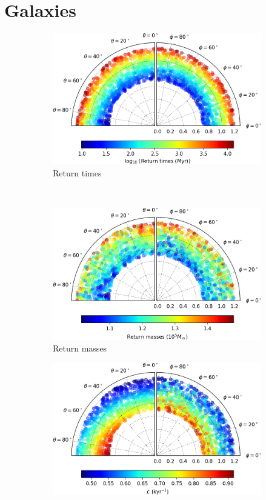 \chapter{Galaxies}

\begin{figure}[h]
    \centering
    \begin{subfigure}[t]{0.4\textwidth}
        \includegraphics[width = \textwidth]{"../Files/Week 13/images/21_time"}
        \caption{Return times}
    \end{subfigure}
    ~ 
    \begin{subfigure}[t]{0.4\textwidth}
        \includegraphics[width=\textwidth]{"../Files/Week 13/images/21_mass"}
        \caption{Return masses}
    \end{subfigure}
    \begin{subfigure}[t]{0.4\textwidth}
        \includegraphics[width=\textwidth]{"../Files/Week 13/images/21_lyapunov"}

\end{subfigure}
\end{figure}
